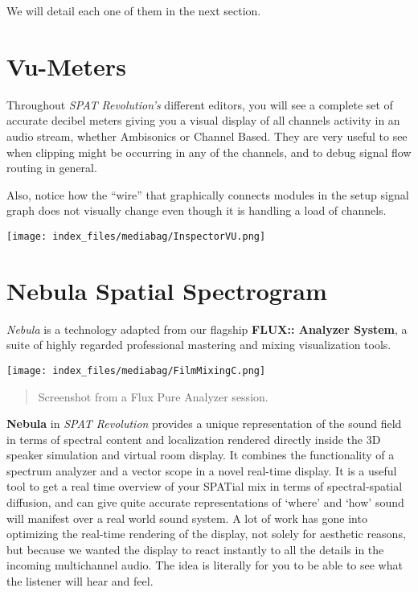\documentclass[
  letterpaper,
  DIV=11,
  numbers=noendperiod]{scrreport}
\begin{document}
We will detail each one of them in the next section.

\hypertarget{vu-meters}{%
\chapter{Vu-Meters}\label{vu-meters}}

Throughout \emph{SPAT Revolution's} different editors, you will see a
complete set of accurate decibel meters giving you a visual display of
all channels activity in an audio stream, whether Ambisonics or Channel
Based. They are very useful to see when clipping might be occurring in
any of the channels, and to debug signal flow routing in general.

Also, notice how the ``wire'' that graphically connects modules in the
setup signal graph does not visually change even though it is handling a
load of channels.

\texttt{[image: index\_files/mediabag/InspectorVU.png]}

\hypertarget{nebula-spatial-spectrogram}{%
\chapter{Nebula Spatial Spectrogram}\label{nebula-spatial-spectrogram}}

\emph{Nebula} is a technology adapted from our flagship \textbf{FLUX::
Analyzer System}, a suite of highly regarded professional mastering and
mixing visualization tools.

\texttt{[image: index\_files/mediabag/FilmMixingC.png]}

\begin{quote}
Screenshot from a Flux Pure Analyzer session.
\end{quote}

\textbf{Nebula} in \emph{SPAT Revolution} provides a unique
representation of the sound field in terms of spectral content and
localization rendered directly inside the 3D speaker simulation and
virtual room display. It combines the functionality of a spectrum
analyzer and a vector scope in a novel real-time display. It is a useful
tool to get a real time overview of your SPATial mix in terms of
spectral-spatial diffusion, and can give quite accurate representations
of `where' and `how' sound will manifest over a real world sound system.
A lot of work has gone into optimizing the real-time rendering of the
display, not solely for aesthetic reasons, but because we wanted the
display to react instantly to all the details in the incoming
multichannel audio. The idea is literally for you to be able to see what
the listener will hear and feel.
\end{document}
